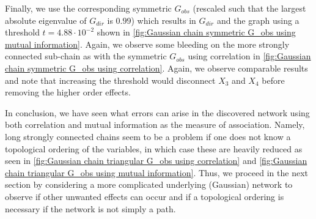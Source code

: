 \documentclass[../Thesis.tex]{subfiles}
\begin{document}
Finally, we use the corresponding symmetric $G_{obs}$ (rescaled such that the largest absolute eigenvalue of $G_{dir}$ is $0.99$) which results in $G_{dir}$ and the graph using a threshold $t=4.88\cdot 10^{-2}$ shown in \autoref{fig:Gaussian chain symmetric G_obs using mutual information}. Again, we observe some bleeding on the more strongly connected sub-chain as with the symmetric $G_{obs}$ using correlation in \autoref{fig:Gaussian chain symmetric G_obs using correlation}. Again, we observe comparable results and note that increasing the threshold would disconnect $X_3$ and $X_4$ before removing the higher order effects.

In conclusion, we have seen what errors can arise in the discovered network using both correlation and mutual information as the measure of association. Namely, long strongly connected chains seem to be a problem if one does not know a topological ordering of the variables, in which case these are heavily reduced as seen in \autoref{fig:Gaussian chain triangular G_obs using correlation} and \autoref{fig:Gaussian chain triangular G_obs using mutual information}. Thus, we proceed in the next section by considering a more complicated underlying (Gaussian) network to observe if other unwanted effects can occur and if a topological ordering is necessary if the network is not simply a path.
\end{document}
